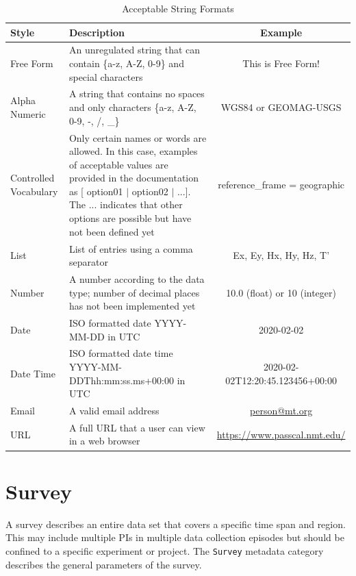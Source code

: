 \documentclass[12pt]{article}
\begin{document}
\begin{table}[hb!]
	\centering
	\caption[Acceptable String Formats]{Acceptable String Formats}
	\begin{tabular}{>{\raggedright}p{.9in}>{\raggedright}p{3.2in}c}
		\toprule
		\textbf{Style} & \textbf{Description}  & \textbf{Example} \\ \midrule
		Free Form & An unregulated string that can contain \{a-z, A-Z, 0-9\} and special characters & This is Free Form! \\ \midrule
		
		Alpha Numeric & A string that contains no spaces and only characters \{a-z, A-Z, 0-9, -, /, \_\} & WGS84 or GEOMAG-USGS \\ \midrule
		Controlled Vocabulary & Only certain names or words are allowed. In this case, examples of acceptable values are provided in the documentation as [ option01 $|$ option02 $|$ ...]. The ... indicates that other options are possible but have not been defined yet &  reference\_frame = geographic \\ \midrule
		List & List of entries using a comma separator & Ex, Ey, Hx, Hy, Hz, T' \\ \midrule
		Number & A number according to the data type; number of decimal places has not been implemented yet & 10.0 (float) or 10 (integer) \\ \midrule
		Date & ISO formatted date YYYY-MM-DD in UTC & 2020-02-02 \\ \midrule
		Date Time & ISO formatted date time YYYY-MM-DDThh:mm:ss.ms+00:00 in UTC & 2020-02-02T12:20:45.123456+00:00 \\ \midrule
		Email & A valid email address & \url{person@mt.org} \\ \midrule
		URL & A full URL that a user can view in a web browser  &  \url{https://www.passcal.nmt.edu/} \\ \bottomrule
		
		
	\end{tabular}
	\label{tab:values}
\end{table}

\clearpage
\newpage
\section{Survey}

A survey describes an entire data set that covers a specific time span and region. This may include multiple PIs in multiple data collection episodes but should be confined to a specific experiment or project. The \verb|Survey| metadata category describes the general parameters of the survey.
\end{document}
